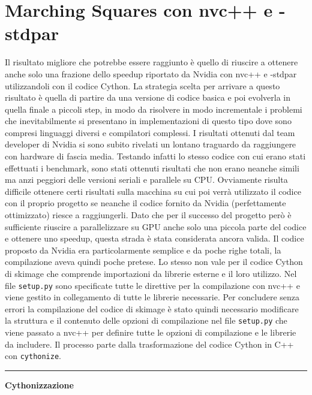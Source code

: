 \documentclass[12pt,a4paper]{report}
\begin{document}
\section{Marching Squares con nvc++ e -stdpar}
Il risultato migliore che potrebbe essere raggiunto è quello di riuscire a ottenere anche solo una frazione dello speedup riportato da Nvidia con nvc++ e -stdpar utilizzandoli con il codice Cython.\newline
La strategia scelta per arrivare a questo risultato è quella di partire da una versione di codice basica e poi evolverla in quella finale a piccoli step, in modo da risolvere in modo incrementale i problemi che inevitabilmente si presentano in implementazioni di questo tipo dove sono compresi linguaggi diversi e compilatori complessi. \newline 
I risultati ottenuti dal team developer di Nvidia si sono subito rivelati un lontano traguardo da raggiungere con hardware di fascia media. Testando infatti lo stesso codice con cui erano stati effettuati i benchmark, sono stati ottenuti risultati che non erano neanche simili ma anzi peggiori delle versioni seriali e parallele su CPU. Ovviamente risulta difficile ottenere certi risultati sulla macchina su cui poi verrà utilizzato il codice con il proprio progetto se neanche il codice fornito da Nvidia (perfettamente ottimizzato) riesce a raggiungerli. Dato che per il successo del progetto però è sufficiente riuscire a parallelizzare su GPU anche solo una piccola parte del codice e ottenere uno speedup, questa strada è stata considerata ancora valida. \newline
Il codice proposto da Nvidia era particolarmente semplice e da poche righe totali, la compilazione aveva quindi poche pretese. Lo stesso non vale per il codice Cython di skimage che comprende importazioni da librerie esterne e il loro utilizzo. Nel file \verb|setup.py| sono specificate tutte le direttive per la compilazione con nvc++ e viene gestito in collegamento di tutte le librerie necessarie. Per concludere senza errori la compilazione del codice di skimage è stato quindi necessario modificare la struttura e il contenuto delle opzioni di compilazione nel file \verb|setup.py| che viene passato a nvc++ per definire tutte le opzioni di compilazione e le librerie da includere. \newline
Il processo parte dalla trasformazione del codice Cython in C++ con \verb|cythonize|. \\[10pt]
\noindent\rule[0.5ex]{\linewidth}{2pt}
\small{\textbf{Cythonizzazione}} \\
\end{document}
